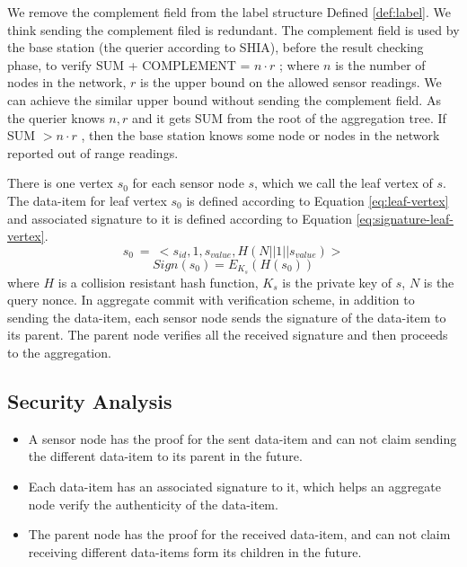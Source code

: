 	We remove the complement field from the label structure Defined \ref{def:label}. 
	We think sending the complement filed is redundant. 
	The complement field is used by the base station (the querier according to SHIA), before the result checking phase, to verify SUM + COMPLEMENT = $n \cdot r$ ; where $n$ is the number of nodes in the network, $r$ is the upper bound on the allowed sensor readings.
	We can achieve the similar upper bound without sending the complement field.
	As the querier knows $n, r$ and it gets SUM from the root of the aggregation tree.
	If SUM $> n \cdot r$ , then the base station knows some node or nodes in the network reported out of range readings. 

	There is one vertex $s_{0}$ for each sensor node $s$, which we call the leaf vertex of $s$.
	The data-item for leaf vertex $s_{0}$ is defined according to Equation \ref{eq:leaf-vertex} and associated signature to it is defined according to Equation \ref{eq:signature-leaf-vertex}.
	\begin{equation}
		\label{eq:leaf-vertex}
		s_{0}\ =\ <s_{id}, 1, s_{value}, H(N||1||s_{value})>
	\end{equation}
	\begin{equation}
		\label{eq:signature-leaf-vertex}
		Sign(s_{0}) = E_{K_{s}}(H(s_{0}))
	\end{equation}
	where $H$ is a collision resistant hash function, $K_{s}$ is the private key of $s$, $N$ is the query nonce.
	In aggregate commit with verification scheme, in addition to sending the data-item, each sensor node sends the signature of the data-item to its parent.
	The parent node verifies all the received signature and then proceeds to the aggregation.
	
	\subsection{Security Analysis}
		\begin{itemize}
			\item A sensor node has the proof for the sent data-item and can not claim sending the different data-item to its parent in the future.
			\item Each data-item has an associated signature to it, which helps an aggregate node verify the authenticity of the data-item.
			\item The parent node has the proof for the received data-item, and can not claim receiving different data-items form its children in the future.
		\end{itemize}

